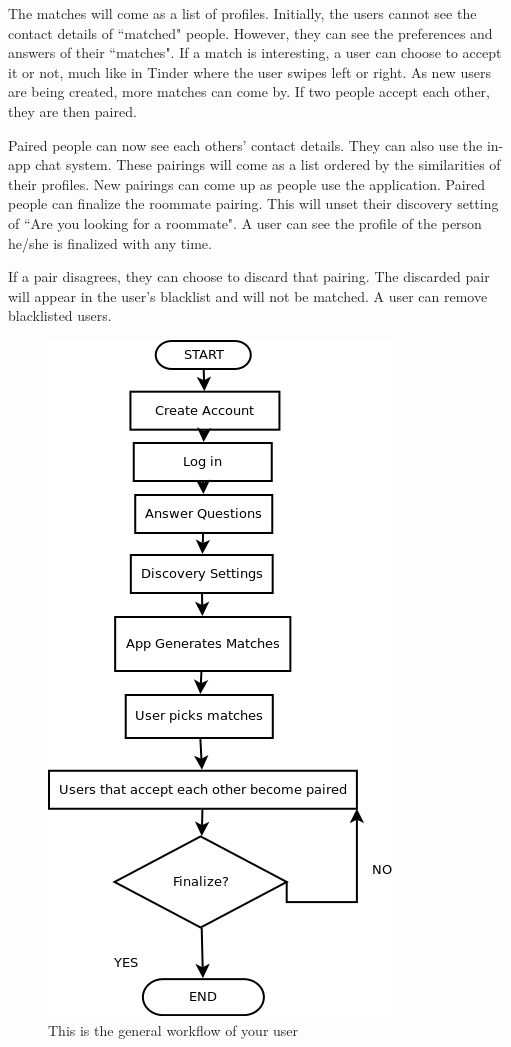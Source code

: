 \documentclass[journal]{./IEEE/IEEEtran}
\begin{document}
The matches will come as a list of profiles. Initially, the users cannot see the contact details of ``matched" people.
However, they can see the preferences and answers of their ``matches". If a match is interesting, a user can choose to
accept it or not, much like in Tinder where the user swipes left or right. As new users are being created, more matches
can come by. If two people accept each other, they are then paired.

Paired people can now see each others' contact details. They can also use the in-app chat system. These pairings will
come as a list ordered by the similarities of their profiles. New pairings can come up as people use the application.
Paired people can finalize the roommate pairing. This will unset their discovery setting of ``Are you looking for a
roommate". A user can see the profile of the person he/she is finalized with any time.

If a pair disagrees, they can choose to discard that pairing. The discarded pair will appear in the user's blacklist and
will not be matched. A user can remove blacklisted users.

\begin{figure}[h]
\centering
\includegraphics[scale=0.5]{Workflow}
\caption{This is the general workflow of your user}
\end{figure}
\end{document}
